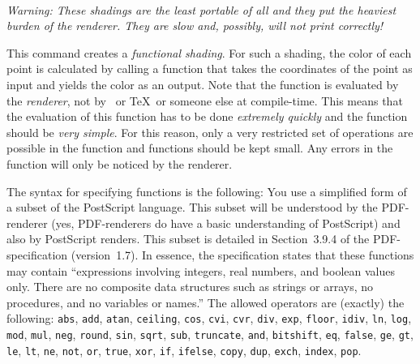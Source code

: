\begin{command}{\pgfdeclarefunctionalshading{}\\
}
    \emph{Warning: These shadings are the least portable of all and they put
    the heaviest burden of the renderer. They are slow and, possibly, will not
    print correctly!}

    This command creates a \emph{functional shading}. For such a shading, the
    color of each point is calculated by calling a function that takes the
    coordinates of the point as input and yields the color as an output. Note
    that the function is evaluated by the \emph{renderer}, not by \pgfname\ or
    \TeX\ or someone else at compile-time. This means that the evaluation of
    this function has to be done \emph{extremely quickly} and the function
    should be \emph{very simple}. For this reason, only a very restricted set
    of operations are possible in the function and functions should be kept
    small. Any errors in the function will only be noticed by the renderer.

    The syntax for specifying functions is the following: You use a simplified
    form of a subset of the PostScript language. This subset will be understood
    by the PDF-renderer (yes, PDF-renderers do have a basic understanding of
    PostScript) and also by PostScript renders. This subset is detailed in
    Section~3.9.4 of the PDF-specification (version~1.7). In essence, the
    specification states that these functions may contain ``expressions
    involving integers, real numbers, and boolean values only. There are no
    composite data structures such as strings or arrays, no procedures, and no
    variables or names.'' The allowed operators are (exactly) the following:
    \texttt{abs}, \texttt{add}, \texttt{atan}, \texttt{ceiling}, \texttt{cos},
    \texttt{cvi}, \texttt{cvr}, \texttt{div}, \texttt{exp}, \texttt{floor},
    \texttt{idiv}, \texttt{ln}, \texttt{log}, \texttt{mod}, \texttt{mul},
    \texttt{neg}, \texttt{round}, \texttt{sin}, \texttt{sqrt}, \texttt{sub},
    \texttt{truncate}, \texttt{and}, \texttt{bitshift}, \texttt{eq},
    \texttt{false}, \texttt{ge}, \texttt{gt}, \texttt{le}, \texttt{lt},
    \texttt{ne}, \texttt{not}, \texttt{or}, \texttt{true}, \texttt{xor},
    \texttt{if}, \texttt{ifelse}, \texttt{copy}, \texttt{dup}, \texttt{exch},
    \texttt{index}, \texttt{pop}.


\end{command}
